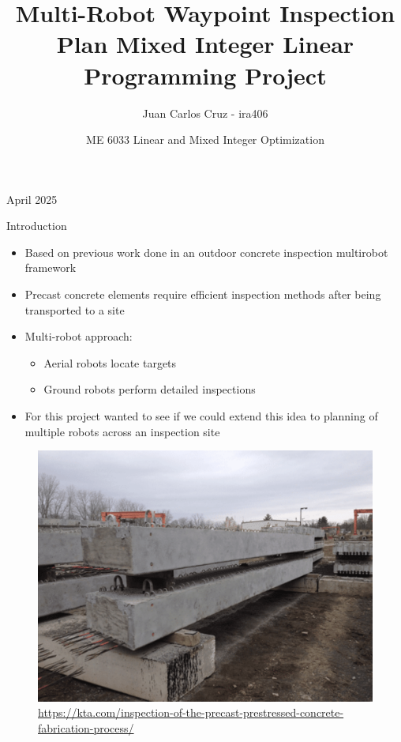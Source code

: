\documentclass[11pt,xcolor={dvipsnames},hyperref={pdftex,pdfpagemode=UseNone,hidelinks,pdfdisplaydoctitle=true},usepdftitle=false]{beamer}
\title{Multi-Robot Waypoint Inspection Plan Mixed Integer Linear Programming Project}
\author{Juan Carlos Cruz - ira406}
\date{ME 6033 Linear and Mixed Integer Optimization}
\begin{document}
    
    \begin{frame}
      \titlepage
      April 2025
    \end{frame}
    
    \begin{frame}{Introduction}
      \begin{itemize}
        \item Based on previous work done in an outdoor concrete inspection multirobot framework
        \item Precast concrete elements require efficient inspection methods after being transported to a site
        \item Multi-robot approach:
          \begin{itemize}
            \item Aerial robots locate targets
            \item Ground robots perform detailed inspections
          \end{itemize}
        \item For this project wanted to see if we could extend this idea to planning of multiple robots across an inspection site
      \end{itemize}

      \begin{figure}
        \centering
        \includegraphics[width=0.3\linewidth]{figures/concrete.pdf}
        \caption{\tiny{\url{https://kta.com/inspection-of-the-precast-prestressed-concrete-fabrication-process/}}}
      \end{figure}
    \end{frame}
\end{document}
